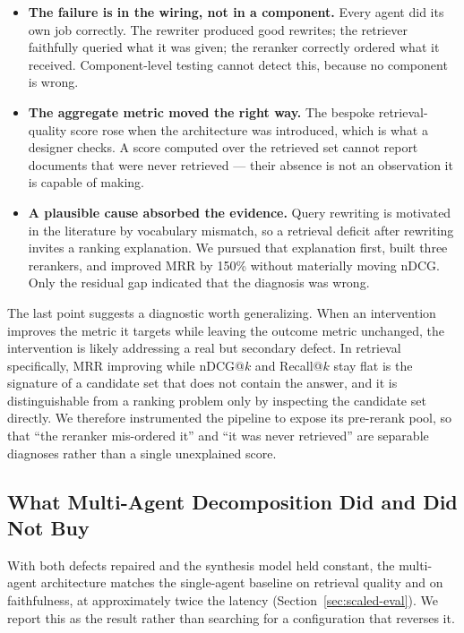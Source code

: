 \begin{itemize}
  \item \textbf{The failure is in the wiring, not in a component.} Every agent
  did its own job correctly. The rewriter produced good rewrites; the retriever
  faithfully queried what it was given; the reranker correctly ordered what it
  received. Component-level testing cannot detect this, because no component is
  wrong.

  \item \textbf{The aggregate metric moved the right way.} The bespoke
  retrieval-quality score rose when the architecture was introduced, which is
  what a designer checks. A score computed over the retrieved set cannot report
  documents that were never retrieved --- their absence is not an observation it
  is capable of making.

  \item \textbf{A plausible cause absorbed the evidence.} Query rewriting is
  motivated in the literature by vocabulary mismatch, so a retrieval deficit
  after rewriting invites a ranking explanation. We pursued that explanation
  first, built three rerankers, and improved MRR by 150\% without materially
  moving nDCG. Only the residual gap indicated that the diagnosis was wrong.
\end{itemize}

The last point suggests a diagnostic worth generalizing. When an intervention
improves the metric it targets while leaving the outcome metric unchanged, the
intervention is likely addressing a real but secondary defect. In retrieval
specifically, MRR improving while nDCG@$k$ and Recall@$k$ stay flat is the
signature of a candidate set that does not contain the answer, and it is
distinguishable from a ranking problem only by inspecting the candidate set
directly. We therefore instrumented the pipeline to expose its pre-rerank pool,
so that ``the reranker mis-ordered it'' and ``it was never retrieved'' are
separable diagnoses rather than a single unexplained score.

\subsection{What Multi-Agent Decomposition Did and Did Not Buy}
\label{sec:decomposition}

With both defects repaired and the synthesis model held constant, the
multi-agent architecture matches the single-agent baseline on retrieval quality
and on faithfulness, at approximately twice the latency
(Section~\ref{sec:scaled-eval}). We report this as the result rather than
searching for a configuration that reverses it.

